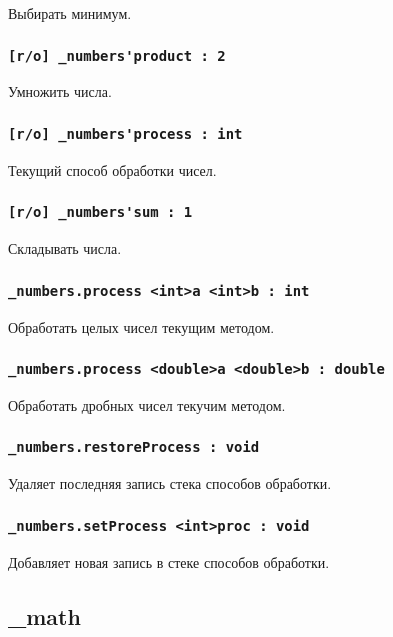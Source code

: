 Выбирать минимум.

\subsubsection{\lstinline|[r/o] _numbers'product : 2|}

Умножить числа.

\subsubsection{\lstinline|[r/o] _numbers'process : int|}

Текущий способ обработки чисел.

\subsubsection{\lstinline|[r/o] _numbers'sum : 1|}

Складывать числа.

\subsubsection{\lstinline|_numbers.process <int>a <int>b : int|}

Обработать целых чисел текущим методом.

\subsubsection{\lstinline|_numbers.process <double>a <double>b : double|}

Обработать дробных чисел текучим методом.

\subsubsection{\lstinline|_numbers.restoreProcess : void|}

Удаляет последняя запись стека способов обработки.

\subsubsection{\lstinline|_numbers.setProcess <int>proc : void|}

Добавляет новая запись в стеке способов обработки.

\subsection{{\color{orange} \_math}}


